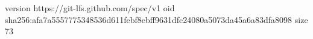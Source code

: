 version https://git-lfs.github.com/spec/v1
oid sha256:afa7a5557775348536d611febf8ebff9631dfc24080a5073da45a6a83dfa8098
size 73
